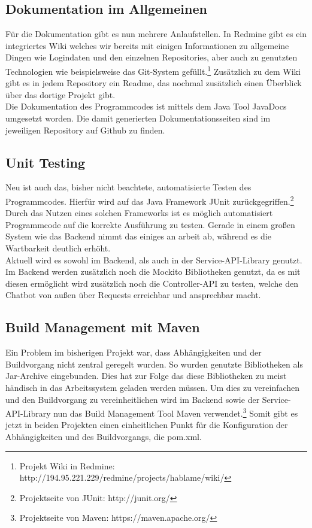 \subsection{Dokumentation im Allgemeinen}
Für die Dokumentation gibt es nun mehrere Anlaufstellen. In Redmine gibt es ein
integriertes Wiki welches wir bereits mit einigen Informationen zu allgemeine
Dingen wie Logindaten und den einzelnen Repositories, aber auch zu genutzten
Technologien wie beispielsweise das Git-System gefüllt.\footnote{Projekt Wiki
in Redmine: http://194.95.221.229/redmine/projects/hablame/wiki/} Zusätzlich zu
dem Wiki gibt es in jedem Repository ein Readme, das nochmal zusätzlich einen
Überblick über das dortige Projekt gibt.\\
Die Dokumentation des Programmcodes ist mittels dem Java Tool JavaDocs
umgesetzt worden. Die damit generierten Dokumentationsseiten sind im jeweiligen
Repository auf Github zu finden.

\subsection{Unit Testing}
Neu ist auch das, bisher nicht beachtete, automatisierte Testen des
Programmcodes. Hierfür wird auf das Java Framework JUnit
zurückgegriffen.\footnote{Projektseite von JUnit: http://junit.org/} Durch das
Nutzen eines solchen Frameworks ist es möglich automatisiert Programmcode auf
die korrekte Ausführung zu testen. Gerade in einem großen System wie das
Backend nimmt das einiges an arbeit ab, während es die Wartbarkeit deutlich erhöht.\\
Aktuell wird es sowohl im Backend, als auch in der Service-API-Library genutzt.\\
Im Backend werden zusätzlich noch die Mockito Bibliotheken genutzt, da es mit
diesen ermöglicht wird zusätzlich noch die Controller-API zu testen, welche den
Chatbot von außen über Requests erreichbar und ansprechbar macht.

\subsection{Build Management mit Maven}
Ein Problem im bisherigen Projekt war, dass Abhängigkeiten und der Buildvorgang
nicht zentral geregelt wurden. So wurden genutzte Bibliotheken als Jar-Archive
eingebunden. Dies hat zur Folge das diese Bibliotheken zu meist händisch in das
Arbeitssystem geladen werden müssen. Um dies zu vereinfachen und den
Buildvorgang zu vereinheitlichen wird im Backend sowie der Service-API-Library
nun das Build Management Tool Maven verwendet.\footnote{Projektseite von Maven:
https://maven.apache.org/} Somit gibt es jetzt in beiden Projekten einen
einheitlichen Punkt für die Konfiguration der Abhängigkeiten und des
Buildvorgangs, die pom.xml.

